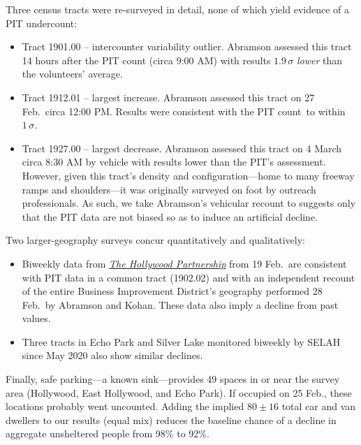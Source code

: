 \documentclass[11pt,twocolumn]{article}
\def\Count{count}
\begin{document}
Three census tracts were re-surveyed in detail, none of which yield evidence of a PIT undercount:
\begin{itemize}
	\item Tract 1901.00 -- intercounter variability outlier. Abramson
		  assessed this tract 14 hours after the PIT count (circa 9:00 AM) with results 
		  $1.9\,\sigma$ {\it lower} than the volunteers' average.
	\item Tract 1912.01 -- largest increase. Abramson assessed this tract on 
		27 Feb.\ circa 12:00 PM. Results were consistent with the PIT \Count\ to within 
		$1\,\sigma$.
	\item Tract 1927.00 -- largest decrease. Abramson assessed this tract
		on 4 March circa 8:30 AM by vehicle with results lower than the PIT's assessment. 
		However, given this tract's density and configuration---home to many freeway ramps and
		shoulders---it was originally surveyed on foot by outreach professionals. As such, we take 
		Abramson's vehicular recount to suggests only that the PIT data are not biased so as to induce 
		an artificial decline.
\end{itemize}

Two larger-geography surveys concur quantitatively and qualitatively:
\begin{itemize}
	\item Biweekly data from \href{https://hollywoodpartnership.com/}{\it The Hollywood Partnership} 
		from 19 Feb.\ are consistent with PIT data in a common tract (1902.02) and with an independent 
		recount of the entire Business Improvement District's geography performed 28 Feb.\ by Abramson and 
		Kohan. These data also imply a decline from past values.
	\item Three tracts in Echo Park and Silver Lake monitored biweekly by SELAH since May 2020 
		also show similar declines. 
\end{itemize}
%
%

Finally, safe parking---a known sink---provides 49 spaces in or near the survey area (Hollywood,
East Hollywood, and Echo Park). If occupied on 25 Feb., these locations probably went uncounted. 
Adding the implied $80\pm16$ total car and van dwellers to our results (equal mix) reduces the baseline 
chance of a decline in aggregate unsheltered people from 98\% to 92\%. 
\end{document}
